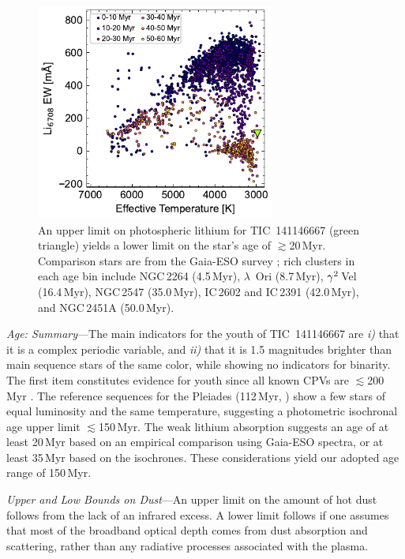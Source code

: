 \documentclass{nature3}
\begin{document}
\begin{methods}
\begin{figure}[!t]
  \centering
  \includegraphics[width=0.7\textwidth]{figures/sf2.pdf}
  \caption{An upper limit on photospheric lithium for TIC~141146667
  (green triangle) yields a lower limit on the star's age of
  $\gtrsim$20\,Myr.  Comparison stars are from the Gaia-ESO survey
  \cite{Jeffries2023}; rich clusters in each age bin include NGC\,2264
  (4.5\,Myr), $\lambda$~Ori (8.7\,Myr), ${\rm \gamma}^2$\,Vel
  (16.4\,Myr), NGC\,2547 (35.0\,Myr), IC\,2602 and IC\,2391 (42.0\,Myr),
  and NGC\,2451A (50.0\,Myr). }
  \label{fig:liew_population}
\end{figure}


{\it Age: Summary}---The main indicators for the youth of
TIC~141146667 are {\it i)} that it is a complex periodic variable, and
{\it ii)} that it is 1.5 magnitudes brighter than main sequence stars
of the same color, while showing no indicators for binarity.  The
first item constitutes evidence for youth since all known CPVs are
$\lesssim$200\,Myr \cite{Bouma2024}.  The reference sequences for the
Pleiades (112\,Myr, \cite{Dahm2015}) show a few stars of equal
luminosity and the same temperature, suggesting a photometric
isochronal age upper limit $\lesssim$150\,Myr.  The weak lithium
absorption suggests an age of at least 20\,Myr based on an empirical
comparison using Gaia-ESO spectra, or at least 35\,Myr based on the
\cite{Feiden2016} isochrones.  These considerations yield our adopted
age range of 150\,Myr.



{\it Upper and Low Bounds on Dust}---An upper limit on the amount of
hot dust follows from the lack of an infrared excess.  A lower limit
follows if one assumes that most of the broadband optical depth comes
from dust absorption and scattering, rather than any radiative
processes associated with the plasma.


\end{methods}
\end{document}
